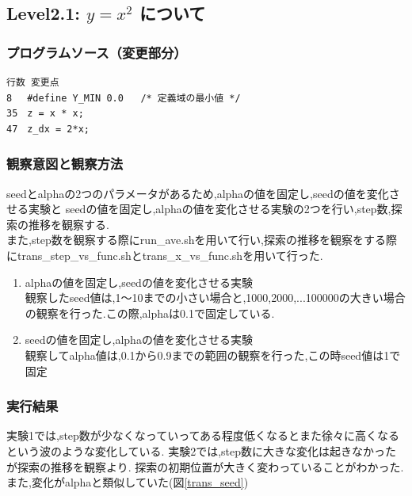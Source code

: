 \subsection{Level2.1: $y=x^2$ について}
\subsubsection{プログラムソース（変更部分）}
\begin{breakbox}
\begin{verbatim}
行数 変更点
8 　#define Y_MIN 0.0   /* 定義域の最小値 */
35　z = x * x;
47　z_dx = 2*x;
\end{verbatim}
\end{breakbox}

\subsubsection{観察意図と観察方法}
seedとalphaの2つのパラメータがあるため,alphaの値を固定し,seedの値を変化させる実験と
seedの値を固定し,alphaの値を変化させる実験の2つを行い,step数,探索の推移を観察する.\\
また,step数を観察する際にrun\_ave.shを用いて行い,探索の推移を観察をする際にtrans\_step\_vs\_func.shとtrans\_x\_vs\_func.shを用いて行った.\\

\begin{enumerate}
	\item  alphaの値を固定し,seedの値を変化させる実験\\
		観察したseed値は,1〜10までの小さい場合と,1000,2000,...100000の大きい場合の観察を行った.この際,alphaは0.1で固定している.
	\item seedの値を固定し,alphaの値を変化させる実験\\
		観察してalpha値は,0.1から0.9までの範囲の観察を行った,この時seed値は1で固定
\end{enumerate}

\subsubsection{実行結果}
実験1では,step数が少なくなっていってある程度低くなるとまた徐々に高くなるという波のような変化している.
実験2では,step数に大きな変化は起きなかったが探索の推移を観察より.
探索の初期位置が大きく変わっていることがわかった.
また,変化がalphaと類似していた(図\ref{trans_seed})


